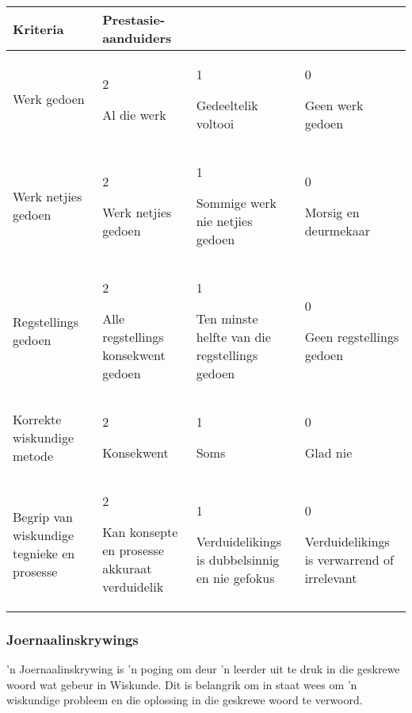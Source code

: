 \begin{table}[H]
 \begin{center}
  \begin{tabular}{|p{3cm}|p{3cm}|p{3cm}|p{3cm}|} \hline
   \textbf{Kriteria} & \textbf{Prestasie-aanduiders} &&\\ \hline
Werk gedoen & 2 \par Al die werk & 1 \par Gedeeltelik voltooi & 0 \par Geen werk gedoen \\ \hline
Werk netjies gedoen & 2 \par Werk netjies gedoen & 1 \par Sommige werk nie netjies gedoen & 0 \par Morsig en deurmekaar\\ \hline
Regstellings gedoen & 2 \par Alle regstellings konsekwent gedoen & 1 \par Ten minste helfte van die regstellings gedoen & 0 \par Geen regstellings gedoen \\ \hline
Korrekte wiskundige metode & 2 \par Konsekwent & 1 \par Soms & 0 \par Glad nie \\ \hline
Begrip van wiskundige tegnieke en prosesse & 2 \par Kan konsepte en prosesse akkuraat verduidelik & 1 \par Verduidelikings is dubbelsinnig en nie gefokus & 0 \par Verduidelikings is verwarrend of irrelevant \\ \hline
  \end{tabular}

 \end{center}

\end{table}

\subsubsection{Joernaalinskrywings}
'n Joernaalinskrywing is 'n poging om deur 'n leerder uit te druk in
die geskrewe woord wat gebeur in Wiskunde. Dit is belangrik om in
staat wees om 'n wiskundige probleem en die oplossing in die geskrewe
woord te verwoord.

